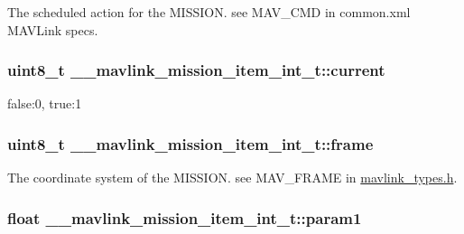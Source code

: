 The scheduled action for the M\+I\+S\+S\+I\+O\+N. see M\+A\+V\+\_\+\+C\+M\+D in common.\+xml M\+A\+V\+Link specs. 

\hypertarget{struct____mavlink__mission__item__int__t_a544991858ce442d37e3a911a36803924}{
\subsubsection[{current}]{\setlength{\rightskip}{0pt plus 5cm}uint8\+\_\+t \+\_\+\+\_\+mavlink\+\_\+mission\+\_\+item\+\_\+int\+\_\+t\+::current}}\label{struct____mavlink__mission__item__int__t_a544991858ce442d37e3a911a36803924}


false\+:0, true\+:1 

\hypertarget{struct____mavlink__mission__item__int__t_aa409967cb161418a0b4919680ba8653c}{
\subsubsection[{frame}]{\setlength{\rightskip}{0pt plus 5cm}uint8\+\_\+t \+\_\+\+\_\+mavlink\+\_\+mission\+\_\+item\+\_\+int\+\_\+t\+::frame}}\label{struct____mavlink__mission__item__int__t_aa409967cb161418a0b4919680ba8653c}


The coordinate system of the M\+I\+S\+S\+I\+O\+N. see M\+A\+V\+\_\+\+F\+R\+A\+M\+E in \hyperlink{mavlink__types_8h}{mavlink\+\_\+types.\+h}. 

\hypertarget{struct____mavlink__mission__item__int__t_a947010581e9d8eec7b617c7e14ced78d}{
\subsubsection[{param1}]{\setlength{\rightskip}{0pt plus 5cm}float \+\_\+\+\_\+mavlink\+\_\+mission\+\_\+item\+\_\+int\+\_\+t\+::param1}}\label{struct____mavlink__mission__item__int__t_a947010581e9d8eec7b617c7e14ced78d}


